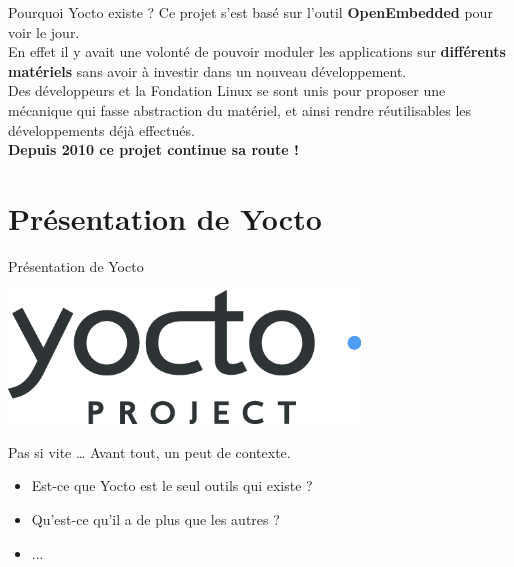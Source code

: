 \documentclass[compress]{smilebeamer}
\begin{document}
\begin{frame}
\begin{block}{Pourquoi Yocto existe ?}
	Ce projet s'est basé sur l'outil \textbf{OpenEmbedded} pour voir le jour.\newline{}\\
	En effet il y avait une volonté de pouvoir moduler les applications sur
	\textbf{différents matériels} sans avoir à investir dans un nouveau développement.
	\newline{}\\
	Des développeurs et la Fondation Linux se sont unis pour proposer	une 
	mécanique qui fasse abstraction du matériel, et ainsi rendre réutilisables
	les développements déjà effectués.\newline{}\\
	\textbf{Depuis 2010 ce projet continue sa route !}
\end{block}
\end{frame}


\section{Présentation de Yocto}

\begin{frame}{Présentation de Yocto}
\begin{center}
\includegraphics[width=0.7\textwidth]{logos/yocto-project-transp.png}
\end{center}
\end{frame}

\begin{frame}{Pas si vite …}
Avant tout, un peut de contexte.\newline
\newline
\begin{itemize}
	\item Est-ce que Yocto est le seul outils qui existe ?
	\item Qu'est-ce qu'il a de plus que les autres ?
	\item ...
\end{itemize}
\end{frame}
\end{document}
